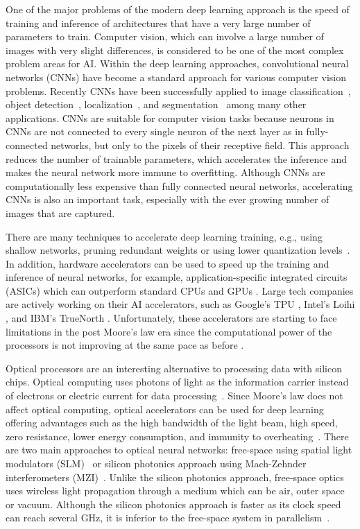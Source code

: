 \documentclass{article}
\begin{document}
One of the major problems of the modern deep learning approach is the speed of training and inference of architectures that have a very large number of parameters to train. Computer vision, which can involve a large number of images with very slight differences, is considered to be one of the most complex problem areas for AI. Within the deep learning approaches, convolutional neural networks (CNNs) have become a standard approach for various computer vision problems. Recently CNNs have been successfully applied to image classification~\cite{krizhevsky_imagenet_2017}, object detection~\cite{redmon_you_2016}, localization~\cite{tompson_efficient_2015}, and segmentation~\cite{ronneberger_u-net_2015} among many other applications. CNNs are suitable for computer vision tasks because neurons in CNNs are not connected to every single neuron of the next layer as in fully-connected networks, but only to the pixels of their receptive field. This approach reduces the number of trainable parameters, which accelerates the inference and makes the neural network more immune to overfitting. Although CNNs are computationally less expensive than fully connected neural networks, accelerating CNNs is also an important task, especially with the ever growing number of images that are captured.

There are many techniques to accelerate deep learning training, e.g., using shallow networks, pruning redundant weights or using lower quantization levels~\cite{rastegari_xnor-net_2016}. In addition, hardware accelerators can be used to speed up the training and inference of neural networks, for example, application-specific integrated circuits (ASICs) which can outperform standard CPUs and GPUs \cite{sunny_survey_2021}. Large tech companies are actively working on their AI accelerators, such as Google's TPU \cite{jouppi_-datacenter_2017}, Intel's Loihi \cite{davies_loihi_2018}, and IBM's TrueNorth \cite{debole_truenorth_2019}. Unfortunately, these accelerators are starting to face limitations in the post Moore's law era since the computational power of the processors is not improving at the same pace as before \cite{waldrop_chips_2016}. 

Optical processors are an interesting alternative to processing data with silicon chips. Optical computing uses photons of light as the information carrier instead of electrons or electric current for data processing~\cite{li_fundamentals_2018}. Since Moore's law does not affect optical computing, optical accelerators can be used for deep learning offering advantages such as the high bandwidth of the light beam, high speed, zero resistance, lower energy consumption, and immunity to overheating~\cite{lin_all-optical_2018}. There are two main approaches to optical neural networks: free-space using spatial light modulators (SLM)~\cite{li_channel_2020,chang_hybrid_2018} or silicon photonics approach using Mach-Zehnder interferometers (MZI)~\cite{shen_deep_2017,hughes_training_2018}. Unlike the silicon photonics approach, free-space optics uses wireless light propagation through a medium which can be air, outer space or vacuum. Although the silicon photonics approach is faster as its clock speed can reach several GHz, it is inferior to the free-space system in parallelism~\cite{sui_review_2020}. 
\end{document}
